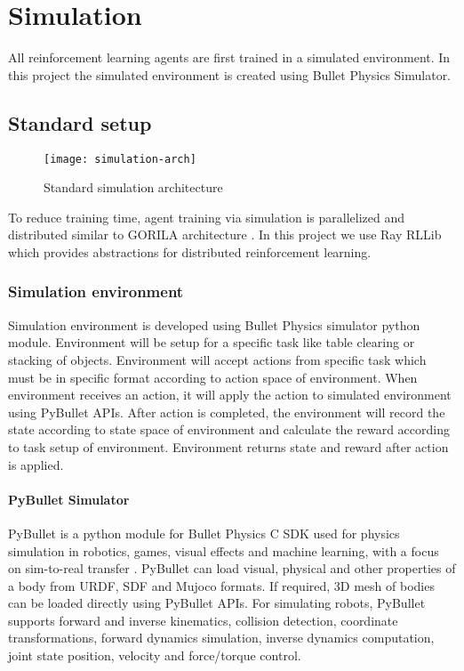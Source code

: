 \chapter{Simulation}

All reinforcement learning agents are first trained in a simulated environment. In this project the simulated environment is created using Bullet Physics Simulator.

\section{Standard setup}
\begin{figure}[H]
	\centering
	\texttt{[image: simulation-arch]}
	\caption{Standard simulation architecture}
	\label{fig:simulation-arch}
\end{figure}

To reduce training time, agent training via simulation is parallelized and distributed similar to GORILA architecture \cite{gorila}. In this project we use Ray RLLib \cite{rllib} which provides abstractions for distributed reinforcement learning.

\subsection{Simulation environment}
Simulation environment is developed using Bullet Physics simulator python module. Environment will be setup for a specific task like table clearing or stacking of objects. Environment will accept actions from specific task which must be in specific format according to action space of environment. When environment receives an action, it will apply the action to simulated environment using PyBullet APIs. After action is completed, the environment will record the state according to state space of environment and calculate the reward according to task setup of environment. Environment returns state and reward after action is applied.

\subsubsection{PyBullet Simulator}
PyBullet is a python module for Bullet Physics C SDK used for physics simulation in robotics, games, visual effects and machine learning, with a focus on sim-to-real transfer \cite{pybullet}. PyBullet can load visual, physical and other properties of a body from URDF, SDF and Mujoco formats. If required, 3D mesh of bodies can be loaded directly using PyBullet APIs. For simulating robots, PyBullet supports forward and inverse kinematics, collision detection, coordinate transformations, forward dynamics simulation, inverse dynamics computation, joint state position, velocity and force/torque control.

